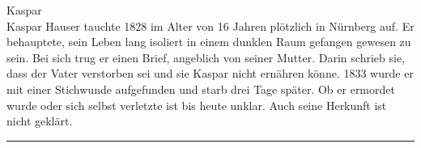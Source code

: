 Kaspar\\[+0.2em]
Kaspar Hauser tauchte 1828 im Alter von 16 Jahren plötzlich in Nürnberg auf. Er behauptete, sein Leben lang isoliert in einem dunklen Raum gefangen gewesen zu sein. Bei sich trug er einen Brief, angeblich von seiner Mutter. Darin schrieb sie, dass der Vater verstorben sei und sie Kaspar nicht ernähren könne.
1833 wurde er mit einer Stichwunde aufgefunden und starb drei Tage später. Ob er ermordet wurde oder sich selbst verletzte ist bis heute unklar. Auch seine Herkunft ist nicht geklärt.\\
\noindent\rule{\textwidth}{0.3pt}\vspace{0.5em}